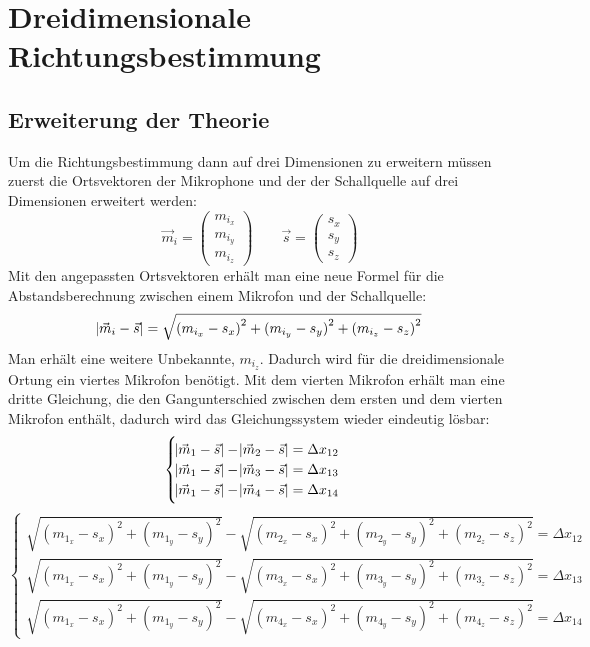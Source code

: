 \section{Dreidimensionale Richtungsbestimmung} 
\subsection{Erweiterung der Theorie}
Um die Richtungsbestimmung dann auf drei Dimensionen zu erweitern müssen zuerst die Ortsvektoren der Mikrophone und der der Schallquelle auf drei Dimensionen erweitert werden: $$\vec{m}_i = \begin{pmatrix}
m_{i_x} \\
m_{i_y} \\
m_{i_z}
\end{pmatrix} \quad\quad
\vec{s} = \begin{pmatrix}
{s_x} \\
{s_y} \\
{s_z}
\end{pmatrix}$$
Mit den angepassten Ortsvektoren erhält man eine neue Formel für die Abstandsberechnung zwischen einem Mikrofon und der Schallquelle:
$$\abs{\vec{m}_i - \vec{s}} = \sqrt{{(m_{i_x} - s_x)}^2 + {(m_{i_y} - s_y)}^2 + {(m_{i_z} - s_z)}^2}$$
Man erhält eine weitere Unbekannte, $m_{i_z}$. Dadurch wird für die dreidimensionale Ortung ein viertes Mikrofon benötigt. Mit dem vierten Mikrofon erhält man eine dritte Gleichung, die den Gangunterschied zwischen dem ersten und dem vierten Mikrofon enthält, dadurch wird das Gleichungssystem wieder eindeutig lösbar:
$$\begin{cases}
\abs{\vec{m}_1 - \vec{s}} - \abs{\vec{m}_2 - \vec{s}} = \Delta{x_{12}} \\
\abs{\vec{m}_1 - \vec{s}} - \abs{\vec{m}_3 - \vec{s}} = \Delta{x_{13}} \\
\abs{\vec{m}_1 - \vec{s}} - \abs{\vec{m}_4 - \vec{s}} = \Delta{x_{14}}
\end{cases}$$
$$\begin{cases}
\sqrt{{(m_{1_x} - s_x)}^2 + {(m_{1_y} - s_y)}^2} - \sqrt{{(m_{2_x} - s_x)}^2 + {(m_{2_y} - s_y)}^2 + {(m_{2_z} - s_z)}^2} = \Delta{x_{12}} \\
\sqrt{{(m_{1_x} - s_x)}^2 + {(m_{1_y} - s_y)}^2} - \sqrt{{(m_{3_x} - s_x)}^2 + {(m_{3_y} - s_y)}^2 + {(m_{3_z} - s_z)}^2} = \Delta{x_{13}} \\
\sqrt{{(m_{1_x} - s_x)}^2 + {(m_{1_y} - s_y)}^2} - \sqrt{{(m_{4_x} - s_x)}^2 + {(m_{4_y} - s_y)}^2 + {(m_{4_z} - s_z)}^2} = \Delta{x_{14}}
\end{cases}$$
